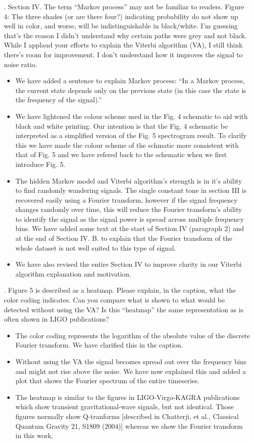 \documentclass{article}
\begin{document}
. Section IV.  The term “Markov process” may not be familiar to readers.  Figure 4: The three shades (or are there four?) indicating probability do not show up well in color, and worse, will be indistinguishable in black/white.  I’m guessing that’s the reason I didn’t understand why certain paths were grey and not black.  While I applaud your efforts to explain the Viterbi algorithm (VA), I still think there’s room for improvement.  I don’t understand how it improves the signal to noise ratio. 
\begin{itemize}
\item We have added a sentence to explain Markov process: ``In a Markov process, the current state depends only on the previous state (in this case the state is the frequency of the signal).''
\item We have lightened the colour scheme used in the Fig. 4 schematic to aid with black and white printing. Our intention is that the Fig. 4 schematic be interpreted as a simplified version of the Fig. 5 spectrogram result. To clarify this we have made the colour scheme of the schmatic more consistent with that of Fig. 5 and we have refered back to the schematic when we first introduce Fig. 5. 
\item The hidden Markov model and Viterbi algorithm's strength is in it's ability to find randomly wandering signals. The single constant tone in section III is recovered easily using a Fourier transform, however if the signal frequency changes randomly over time, this will reduce the Fourier transform's ability to identify the signal as the signal power is spread across multiple frequency bins. We have added some text at the start of Section IV (paragraph 2) and at the end of Section IV. B. to explain that the Fourier transform of the whole dataset is not well suited to this type of signal.
\item We have also revised the entire Section IV to improve clarity in our Viterbi algorithm explanation and motivation.
\end{itemize}


. Figure 5 is described as a heatmap.  Please explain, in the caption, what the color coding indicates.  Can you compare what is shown to what would be detected without using the VA?  Is this “heatmap” the same representation as is often shown in LIGO publications?
\begin{itemize}
\item The color coding represents the logarithm of the absolute value of the discrete Fourier transform. We have clarified this in the caption.
\item Without using the VA the signal becomes spread out over the frequency bins and might not rise above the noise. We have now explained this and added a plot that shows the Fourier spectrum of the entire timeseries.
\item The heatmap is similar to the figures in LIGO-Virgo-KAGRA publications which show transient gravitational-wave signals, but not identical. Those figures normally show Q-tranforms [described in Chatterji, et al., Classical Quantum Gravity 21, S1809 (2004)] whereas we show the Fourier transform in this work. 
\end{itemize}
\end{document}
